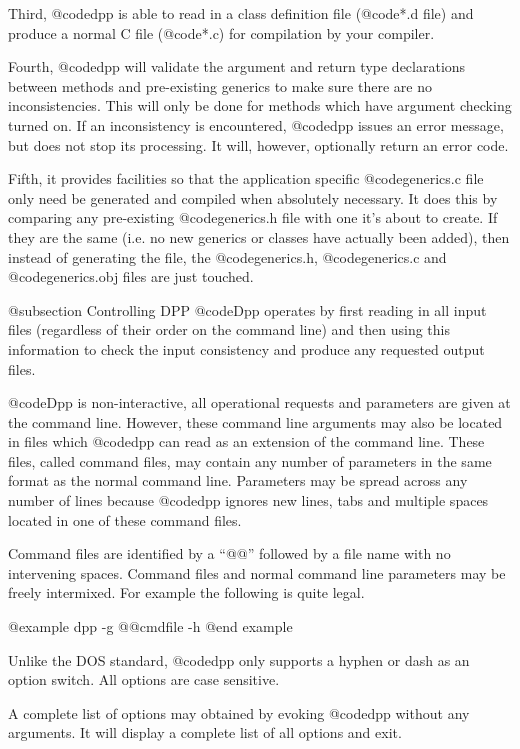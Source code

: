 Third, @code{dpp} is able to read in a class definition file
(@code{*.d} file) and produce a normal C file (@code{*.c})
for compilation by your compiler.

Fourth, @code{dpp} will validate the argument and return type
declarations between methods and pre-existing generics to make sure
there are no inconsistencies.  This will only be done for methods which
have argument checking turned on.  If an inconsistency is encountered,
@code{dpp} issues an error message, but does not stop its processing.
It will, however, optionally return an error code.

Fifth, it provides facilities so that the application specific
@code{generics.c} file only need be generated and compiled when
absolutely necessary.  It does this by comparing any pre-existing
@code{generics.h} file with one it's about to create.  If they are the
same (i.e. no new generics or classes have actually been added), then
instead of generating the file, the @code{generics.h}, @code{generics.c}
and @code{generics.obj} files are just touched.


@subsection Controlling DPP
@code{Dpp} operates by first reading in all input files (regardless
of their order on the command line) and then using this information
to check the input consistency and produce any requested output files.

@code{Dpp} is non-interactive, all operational requests and parameters
are given at the command line.  However, these command line arguments
may also be located in files which @code{dpp} can read as an extension
of the command line.  These files, called command files, may contain
any number of parameters in the same format as the normal command line.
Parameters may be spread across any number of lines because @code{dpp}
ignores new lines, tabs and multiple spaces located in one of these
command files.

Command files are identified by a ``@@'' followed by a file name with
no intervening spaces.  Command files and normal command line
parameters may be freely intermixed.  For example the following
is quite legal.

@example
        dpp -g @@cmdfile -h
@end example

Unlike the DOS standard, @code{dpp} only supports a hyphen or dash
as an option switch.  All options are case sensitive.

A complete list of options may obtained by evoking @code{dpp} without
any arguments.  It will display a complete list of all options and
exit.

